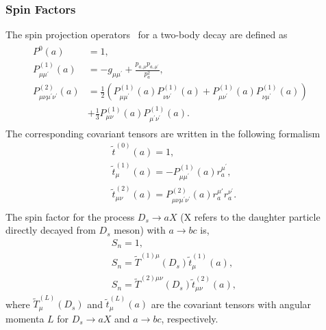 \documentclass[aps,prd,twocolumn,showpacs,amsmath,amssymb]{revtex4-1}
\begin{document}
\subsubsection{Spin Factors}
\label{spin-factor}
The spin projection operators~\cite{covariant-tensors} for a two-body decay are defined as
\begin{eqnarray}                                                                                                                                                                              
    \begin{aligned}
        P^{0}(a) &= 1, &\\
        P^{(1)}_{\mu\mu^{'}}(a) &= -g_{\mu\mu^{'}}+\frac{p_{a,\mu}p_{a,\mu^{'}}}{p_{a}^{2}}, &\\
        P^{(2)}_{\mu\nu\mu^{'}\nu^{'}}(a) &= \frac{1}{2}(P^{(1)}_{\mu\mu^{'}}(a)P^{(1)}_{\nu\nu^{'}}(a)+P^{(1)}_{\mu\nu^{'}}(a)P^{(1)}_{\nu\mu^{'}}(a)) & &\\
                                          &+\frac{1}{3}P^{(1)}_{\mu\nu}(a)P^{(1)}_{\mu^{'}\nu^{'}}(a).            &
    \end{aligned}
    \label{spin-projection-operators} 
\end{eqnarray}
The corresponding covariant tensors are written in the following formalism
\begin{equation}
    \begin{array}{lr}
        \tilde{t}^{(0)}(a) = 1, &\\
        \tilde{t}^{(1)}_{\mu}(a) = -P^{(1)}_{\mu\mu^{'}}(a)r^{\mu^{'}}_{a}, &\\
        \tilde{t}^{(2)}_{\mu\nu}(a) = P^{(2)}_{\mu\nu\mu^{'}\nu^{'}}(a)r^{\mu{'}}_{a}r^{\nu^{'}}_{a}. &\\
    \end{array}\label{covariant-tensors} 
\end{equation}
The spin factor for the process $D_{s} \rightarrow aX$ (X refers to the daughter particle directly decayed from $D_{s}$ meson) with $a \rightarrow bc$ is, 
\begin{equation}
    \begin{array}{lr}
        S_{n} = 1, &\\
        S_{n} = \tilde{T}^{(1)\mu}(D_{s})\tilde{t}^{(1)}_{\mu}(a), &\\
        S_{n} = \tilde{T}^{(2)\mu\nu}(D_{s})\tilde{t}^{(2)}_{\mu\nu}(a), &
    \end{array}\label{spin-factor} 
\end{equation}
where $\tilde{T}^{(L)}_\mu(D_{s})$ and $\tilde{t}^{(L)}_\mu(a)$ are the covariant tensors with angular momenta $L$ for $D_{s} \rightarrow aX$ and $ a \rightarrow bc$, respectively.
\end{document}
